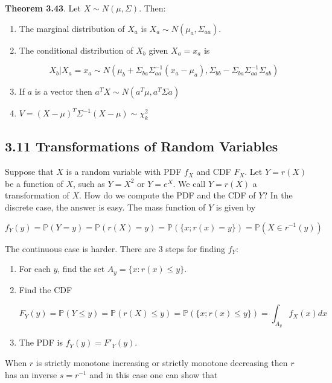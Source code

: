\textbf{Theorem 3.43}. Let \(X \sim N(\mu, \Sigma)\). Then:

\begin{enumerate}[label={\arabic*.}]
\item
  The marginal distribution of \(X_a\) is
  \(X_a \sim N(\mu_a, \Sigma_{aa})\).
\item
  The conditional distribution of \(X_b\) given \(X_a = x_a\) is

  \[  X_b | X_a = x_a \sim N \left( \mu_b + \Sigma_{ba}\Sigma_{aa}^{-1}(x_a - \mu_a), \Sigma_{bb} - \Sigma_{ba} \Sigma_{aa}^{-1} \Sigma_{ab} \right) \]
\item
  If \(a\) is a vector then \(a^T X \sim N(a^T \mu, a^T \Sigma a)\)
\item
  \(V = (X - \mu)^T \Sigma^{-1} (X - \mu) \sim \chi_{k}^{2}\)
\end{enumerate}

\subsection*{3.11 Transformations of Random
Variables}\label{transformations-of-random-variables}

Suppose that \(X\) is a random variable with PDF \(f_X\) and CDF
\(F_X\). Let \(Y = r(X)\) be a function of \(X\), such as \(Y = X^{2}\) or
\(Y = e^X\). We call \(Y = r(X)\) a transformation of \(X\). How do we
compute the PDF and the CDF of \(Y\)? In the discrete case, the answer
is easy. The mass function of \(Y\) is given by

\[ f_Y(y) = \mathbb{P}(Y = y) = \mathbb{P}(r(X) = y) = \mathbb{P}(\{x; r(x) = y\}) = \mathbb{P}(X \in r^{-1}(y)) \]

The continuous case is harder. There are 3 steps for finding \(f_Y\):

\begin{enumerate}[label={\arabic*.}]
\item
  For each \(y\), find the set \(A_y = \{ x : r(x) \leq y \}\).
\item
  Find the CDF

  \[ F_Y(y) = \mathbb{P}(Y \leq y) = \mathbb{P}(r(X) \leq y) = \mathbb{P}(\{x ; r(x) \leq y \}) = \int_{A_y} f_X(x) dx \]
\item
  The PDF is \(f_Y(y) = F'_Y(y)\).
\end{enumerate}

When \(r\) is strictly monotone increasing or strictly monotone
decreasing then \(r\) has an inverse \(s = r^{-1}\) and in this case one
can show that

